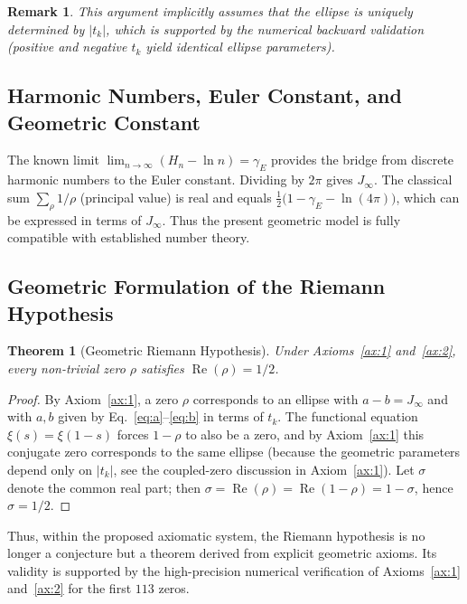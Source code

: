 \documentclass[12pt,a4paper]{article}
\newtheorem{theorem}{Theorem}[section]
\newtheorem{remark}{Remark}[section]
\DeclareMathOperator{\Reop}{Re}
\begin{document}
\begin{remark}\label{rem:uniqueness}
This argument implicitly assumes that the ellipse is uniquely determined by $|t_k|$, which is supported by the numerical backward validation (positive and negative $t_k$ yield identical ellipse parameters).
\end{remark}

\subsection{Harmonic Numbers, Euler Constant, and Geometric Constant}\label{subsec:chain}
The known limit $\lim_{n\to\infty}(H_n - \ln n) = \gamma_E$ provides the bridge from discrete harmonic numbers to the Euler constant. Dividing by $2\pi$ gives $J_\infty$. The classical sum $\sum_{\rho} 1/\rho$ (principal value) is real and equals $\frac12\bigl(1-\gamma_E-\ln(4\pi)\bigr)$, which can be expressed in terms of $J_\infty$. Thus the present geometric model is fully compatible with established number theory.

\subsection{Geometric Formulation of the Riemann Hypothesis}\label{subsec:grh}
\begin{theorem}[Geometric Riemann Hypothesis]\label{thm:grh}
Under Axioms~\ref{ax:1} and~\ref{ax:2}, every non-trivial zero $\rho$ satisfies $\Reop(\rho)=1/2$.
\end{theorem}
\begin{proof}
By Axiom~\ref{ax:1}, a zero $\rho$ corresponds to an ellipse with $a-b=J_\infty$ and with $a,b$ given by Eq.~\eqref{eq:a}--\eqref{eq:b} in terms of $t_k$. The functional equation $\xi(s)=\xi(1-s)$ forces $1-\rho$ to also be a zero, and by Axiom~\ref{ax:1} this conjugate zero corresponds to the same ellipse (because the geometric parameters depend only on $|t_k|$, see the coupled-zero discussion in Axiom~\ref{ax:1}). Let $\sigma$ denote the common real part; then $\sigma = \Reop(\rho) = \Reop(1-\rho) = 1-\sigma$, hence $\sigma = 1/2$.

\end{proof}

Thus, within the proposed axiomatic system, the Riemann hypothesis is no longer a conjecture but a theorem derived from explicit geometric axioms. Its validity is supported by the high-precision numerical verification of Axioms~\ref{ax:1} and~\ref{ax:2} for the first $113$ zeros.
\end{document}
